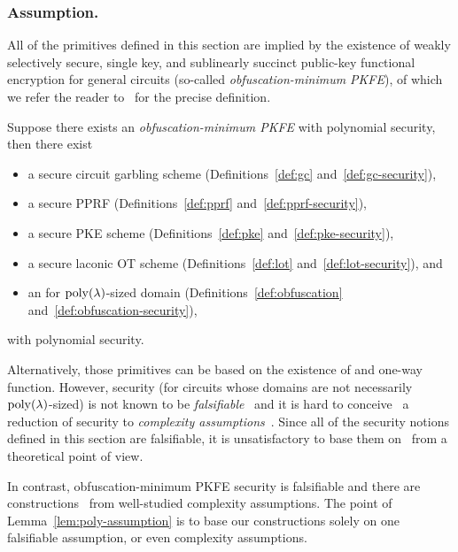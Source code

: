 \subsubsection{Assumption.}
All of the primitives defined in this section are implied by the existence of
weakly selectively secure, single key, and sublinearly succinct
public-key functional encryption for general circuits
(so-called \emph{obfuscation-minimum PKFE}),
of which we refer the reader to~\cite{C:KNTY19} for the precise definition.

\begin{lemma}\label{lem:poly-assumption}
Suppose there exists an \emph{obfuscation-minimum PKFE} with polynomial security, then there exist
\begingroup
{}
\begin{itemize}
\item {}
a secure circuit garbling scheme (Definitions~\ref{def:gc} and~\ref{def:gc-security}),
\item {}
a secure PPRF (Definitions~\ref{def:pprf} and~\ref{def:pprf-security}),
\item {}
a secure PKE scheme (Definitions~\ref{def:pke} and~\ref{def:pke-security}),
\item {}
a secure laconic OT scheme (Definitions~\ref{def:lot} and~\ref{def:lot-security}), and
\item {}
an {\iO} for $\operatorname{poly}(\lambda)$-sized domain (Definitions~\ref{def:obfuscation} and~\ref{def:obfuscation-security}),
\end{itemize}
with polynomial security.
\endgroup
\end{lemma}

\noindent
Alternatively, those primitives can be based on the existence of {\iO} and one-way function.
However, {\iO} security (for circuits whose domains are not necessarily $\operatorname{poly}(\lambda)$-sized) is not known to be \emph{falsifiable}~\cite{STOC:GenWic11} and it is hard to conceive~\cite{STOC:GGSW13} a reduction of {\iO} security to \emph{complexity assumptions}~\cite{TCC:GolKal16}.
Since all of the security notions defined in this section are falsifiable,
it is unsatisfactory to base them on~{\iO} from a theoretical point of view.

In contrast, obfuscation-minimum PKFE security is falsifiable and there are constructions~\cite{STOC:JaiLinSah21,EC:JaiLinSah22corrected} from well-studied complexity assumptions.
The point of Lemma~\ref{lem:poly-assumption} is to base our constructions solely on one falsifiable assumption, or even complexity assumptions.
